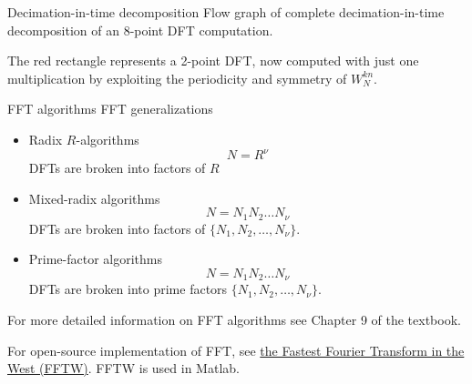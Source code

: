 \documentclass[10pt]{beamer}
\begin{document}
% 
\begin{frame}{Decimation-in-time decomposition}
Flow graph of complete decimation-in-time decomposition of an 8-point DFT computation.

The red rectangle represents a 2-point DFT, now computed with just one multiplication by exploiting the periodicity and symmetry of $W_N^{kn}$. 
\begin{center}
\end{center}
\end{frame}

% 
\begin{frame}{FFT algorithms}
	FFT generalizations
	\begin{itemize}
		\item Radix $R$-algorithms
		\begin{equation*}
			N = R^\nu
		\end{equation*}
		DFTs are broken into factors of $R$
		
		\item Mixed-radix algorithms
		\begin{equation*}
			N = N_1N_2\ldots N_\nu
		\end{equation*}
		DFTs are broken into factors of $\{N_1, N_2, \ldots, N_\nu\}$.
		
		\item Prime-factor algorithms
		\begin{equation*}
			N = N_1N_2\ldots N_\nu
		\end{equation*}
		DFTs are broken into prime factors $\{N_1, N_2, \ldots, N_\nu\}$.
\end{itemize}
\vspace{0.25cm}
For more detailed information on FFT algorithms see Chapter 9 of the textbook.

\vspace{0.25cm}
For open-source implementation of FFT, see \href{http://www.fftw.org/}{the Fastest Fourier Transform in the West (FFTW)}. FFTW is used in Matlab.
\end{frame}
\end{document}
